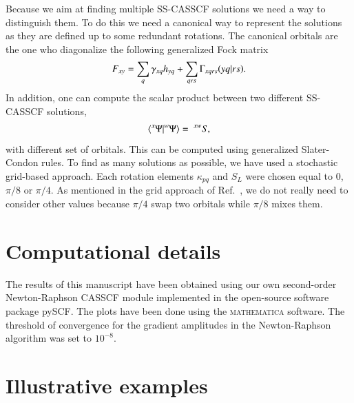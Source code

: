 \documentclass[aps,prb,reprint,showkeys,superscriptaddress]{revtex4-1}
\begin{document}
Because we aim at finding multiple SS-CASSCF solutions we need a way to distinguish them.
To do this we need a canonical way to represent the solutions as they are defined up to some redundant rotations. \cite{Helgaker_2000}
The canonical orbitals are the one who diagonalize the following generalized Fock matrix
\begin{equation}
  \label{eq:general_fock}
  F_{xy} = \sum_q \gamma_{xq}h_{yq} + \sum_{qrs} \Gamma_{xqrs}\ceri{yq}{rs}.
\end{equation}
In addition, one can compute the scalar product between two different SS-CASSCF solutions,
\begin{equation}
  \label{eq:scalprod}
  \braket{^x\Psi}{^w\Psi} =~^{xw}S,
\end{equation}
with different set of orbitals. This can be computed using generalized Slater-Condon rules. \cite{Burton_2021a}
To find as many solutions as possible, we have used a stochastic grid-based approach.
Each rotation elements $\kappa_{pq}$ and $S_{L}$ were chosen equal to $0$, $\pi/8$ or $\pi/4$.
As mentioned in the grid approach of Ref.~, we do not really need to consider other values because $\pi/4$ swap two orbitals while $\pi/8$ mixes them.

\section{Computational details}
\label{sec:comp_details}

The results of this manuscript have been obtained using our own second-order Newton-Raphson CASSCF module implemented in the open-source software package pySCF. \cite{Sun_2020}
The plots have been done using the \textsc{mathematica} software. \cite{Mathematica}
The threshold of convergence for the gradient amplitudes in the Newton-Raphson algorithm was set to $10^{-8}$.

\section{Illustrative examples}
\label{sec:illustrative}
\end{document}
